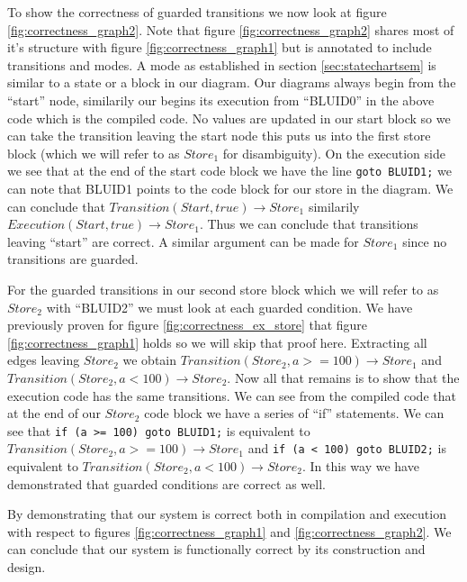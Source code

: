 To show the correctness of guarded transitions we now look at figure \ref{fig:correctness_graph2}. Note that figure \ref{fig:correctness_graph2} shares most of it's structure with figure \ref{fig:correctness_graph1} but is annotated to include transitions and modes. A mode as established in section \ref{sec:statechartsem} is similar to a state or a block in our diagram. Our diagrams always begin from the ``start'' node, similarily our begins its execution from ``BLUID0'' in the above code which is the compiled code. No values are updated in our start block so we can take the transition leaving the start node this puts us into the first store block (which we will refer to as $Store_1$ for disambiguity). On the execution side we see that at the end of the start code block we have the line \texttt{goto BLUID1;} we can note that BLUID1 points to the code block for our store in the diagram. We can conclude that $Transition(Start, true) \rightarrow Store_1$ similarily $Execution(Start, true) \rightarrow Store_1$. Thus we can conclude that transitions leaving ``start'' are correct. A similar argument can be made for $Store_1$ since no transitions are guarded.

For the guarded transitions in our second store block which we will refer to as $Store_2$ with ``BLUID2'' we must look at each guarded condition. We have previously proven for figure \ref{fig:correctness_ex_store} that figure \ref{fig:correctness_graph1} holds so we will skip that proof here. Extracting all edges leaving $Store_2$ we obtain $Transition(Store_2, a >= 100) \rightarrow Store_1$ and $Transition(Store_2, a < 100) \rightarrow Store_2$. Now all that remains is to show that the execution code has the same transitions. We can see from the compiled code that at the end of our $Store_2$ code block we have a series of ``if'' statements. We can see that \texttt{if (a >= 100) goto BLUID1;} is equivalent to $Transition(Store_2, a >= 100) \rightarrow Store_1$ and \texttt{if (a < 100) goto BLUID2;} is equivalent to $Transition(Store_2, a < 100) \rightarrow Store_2$. In this way we have demonstrated that guarded conditions are correct as well.


By demonstrating that our system is correct both in compilation and execution with respect to figures \ref{fig:correctness_graph1} and \ref{fig:correctness_graph2}. We can conclude that our system is functionally correct by its construction and design.

